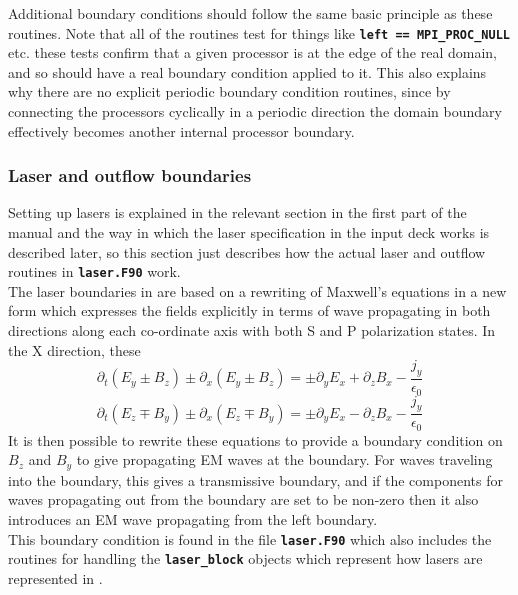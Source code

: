 \documentclass[12pt,a4paper]{article}
\newcommand{\inlinecode}[1]{{\color{warwickred} \bf\texttt{#1}}}
\newcommand{\EPOCH}{{\color{warwickdark}\fontfamily{phv}\selectfont{EPOCH}}}
\begin{document}
Additional boundary conditions should follow the same basic principle as these
routines. Note that all of the routines test for things like \inlinecode{left
== MPI\_PROC\_NULL} etc. these tests confirm that a given processor is at the
edge of the real domain, and so should have a real boundary condition applied
to it. This also explains why there are no explicit periodic boundary condition
routines, since by connecting the processors cyclically in a periodic direction
the domain boundary effectively becomes another internal processor boundary.

\subsubsection{Laser and outflow boundaries}
Setting up lasers is explained in the relevant section in the first part of the
manual and the way in which the laser specification in the input deck works is
described later, so this section just describes how the actual laser and
outflow routines in \inlinecode{laser.F90} work. \\

The laser boundaries in {\EPOCH} are based on a rewriting of Maxwell's equations
in a new form which expresses the fields explicitly in terms of wave
propagating in both directions along each co-ordinate axis with both S and P
polarization states. In the X direction, these
\[
\partial_t(E_y \pm B_z) \pm \partial_x(E_y \pm B_z) = \pm \partial_yE_x
+ \partial_zB_x -\frac{j_y}{\epsilon_0}
\]
\[
\partial_t(E_z \mp B_y) \pm \partial_x(E_z \mp B_y) = \pm \partial_yE_x
- \partial_zB_x -\frac{j_y}{\epsilon_0}
\]
It is then possible to rewrite these equations to provide a boundary condition
on $B_z$ and $B_y$ to give propagating EM waves at the boundary. For waves
traveling into the boundary, this gives a transmissive boundary, and if the
components for waves propagating out from the boundary are set to be non-zero
then it also introduces an EM wave propagating from the left boundary.\\

This boundary condition is found in the file \inlinecode{laser.F90} which also
includes the routines for handling the \inlinecode{laser\_block} objects which
represent how lasers are represented in \EPOCH.
\end{document}
